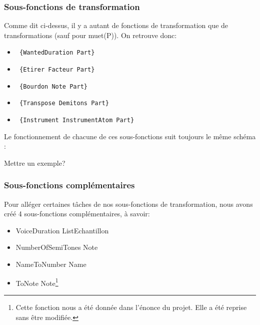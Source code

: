\documentclass[12pt,a4paper]{article}
\begin{document}
\subsubsection{Sous-fonctions de transformation}

Comme dit ci-dessus, il y a autant de fonctions de transformation que de transformations (sauf pour muet(P)). On retrouve donc:
\begin{itemize}
\item \begin{verbatim} {WantedDuration Part} \end{verbatim}
\item \begin{verbatim} {Etirer Facteur Part} \end{verbatim}
\item \begin{verbatim} {Bourdon Note Part} \end{verbatim}
\item \begin{verbatim} {Transpose Demitons Part} \end{verbatim}
\item \begin{verbatim} {Instrument InstrumentAtom Part} \end{verbatim} 
\end{itemize}

Le fonctionnement  de chacune de ces sous-fonctions suit toujours le même schéma :

Mettre un exemple?

\subsubsection{Sous-fonctions complémentaires}

Pour alléger certaines tâches de nos sous-fonctions de transformation,  nous avons créé 4 sous-fonctions complémentaires, à savoir:
\begin{itemize}
\item {VoiceDuration ListEchantillon}
\item {NumberOfSemiTones Note}
\item {NameToNumber Name}
\item {ToNote Note}\footnote{Cette fonction nous a été donnée dans l'énonce du projet. Elle a été reprise sans être modifiée.}
\end{itemize}
\end{document}
